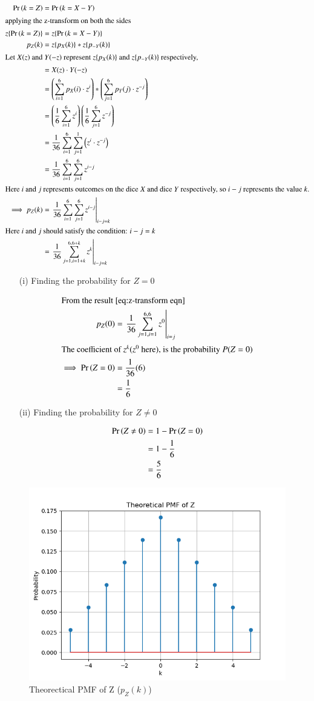 \documentclass[journal,12pt,twocolumn]{IEEEtran}
\theoremstyle{remark}
\begin{document}
\begin{align}
	\Pr\left(k=Z\right) &= \Pr\left(k=X-Y\right)\\
	\intertext{applying the z-transform on both the sides}
	z\{\Pr\left(k=Z\right)\} &= z\{\Pr\left(k=X-Y\right)\}\\
	p_Z(k) &= z\{p_X(k)\}*z\{p_{-Y}(k)\}\\ \intertext{Let $X(z)$ and $Y(-z)$ represent $z\{p_X(k)\}$ and $z\{p_{-Y}(k)\}$ respectively,}
	&= X(z)\cdot Y(-z)\\
	&= \left(\sum^6_{i=1}p_X(i)\cdot z^i\right)*\left(\sum^6_{j=1}p_Y(j)\cdot z^{-j}\right)\\
	&= \left(\frac{1}{6}\sum^6_{i=1}z^i\right)\left(\frac{1}{6}\sum^6_{j=1}z^{-j}\right)\\
	&= \frac{1}{36}\sum^6_{i=1}\sum^1_{j=1}\left(z^i\cdot z^{-j}\right)\\
	&= \frac{1}{36}\sum^6_{i=1}\sum^6_{j=1}z^{i-j}\\
	\intertext{Here $i$ and $j$ represents outcomes on the dice $X$ and dice $Y$ respectively, so $i-j$ represents the value $k$.}
	\implies p_Z(k) &= \left. \frac{1}{36}\sum^6_{i=1}\sum^6_{j=1}z^{i-j} \right|_{i-j=k}\\
	\intertext{Here $i$ and $j$ should satisfy the condition: $i-j = k$}
	&= \left. \frac{1}{36}\sum^{6,6+k}_{j=1,i=1+k}z^{k}\right|_{i-j=k} \label{eq:z-transform eqn}
\end{align}
\begin{enumerate}
\item[(i)] Finding the probability for $Z = 0$
\end{enumerate}
\begin{align}
	\intertext{From the result $\eqref{eq:z-transform eqn}$}
	p_Z(0) &= \left. \frac{1}{36}\sum^{6,6}_{j=1,i=1}z^{0}\right|_{i=j}\\
	\intertext{The coefficient of $z^k (z^0$ here), is the probability $P(Z=0)$}
	\implies \Pr\left(Z=0\right) &= \frac{1}{36}(6)\\
	&= \frac{1}{6}
\end{align}
\begin{enumerate}
\item[(ii)] Finding the probability for $Z \neq 0$
\end{enumerate}
\begin{align}
	\Pr\left(Z \neq 0\right) &= 1-\Pr\left(Z=0\right)\\
	&= 1-\frac{1}{6}\\
	&= \frac{5}{6}
\end{align}
\newpage
\begin{figure}
\centering
\includegraphics[width=\columnwidth]{./figs/main_act.png}
\caption{Theorectical PMF of Z ($p_Z(k)$)}
\label{fig:theo_pmf(Z)}
\end{figure}
\end{document}
